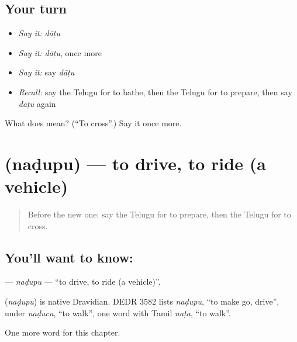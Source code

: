 \subsection*{Your turn}
\begin{itemize}
\raggedright
  \item \emph{Say it:} \emph{dāṭu}
  \item \emph{Say it:} \emph{dāṭu}, once more
  \item \emph{Say it:} say \emph{dāṭu}
  \item \emph{Recall:} say the Telugu for to bathe, then the Telugu for to prepare, then say \emph{dāṭu} again
\end{itemize}

\begin{tcolorbox}[breakable,colback=teal!4,colframe=teal!35!black,title={Before you move on}]
What does  mean? (\textquotedblleft{}To cross\textquotedblright{}.) Say it once more.
\end{tcolorbox}
\section[\texorpdfstring{\te{నడుపు} (naḍupu)}{నడుపు (naḍupu)}]{ (naḍupu) — to drive, to ride (a vehicle)}

\label{lesson:TE-C278-nadupu}



\begin{quote}
Before the new one: say the Telugu for to prepare, then the Telugu for to cross.
\end{quote}

\subsection*{You'll want to know: }
\textbf{} — \emph{naḍupu} — \textquotedblleft{}to drive, to ride (a vehicle)\textquotedblright{}.

\begin{cousinweb}
\textbf{} (\emph{naḍupu}) is native Dravidian. DEDR 3582 lists \emph{naḍupu}, \textquotedblleft{}to make go, drive\textquotedblright{}, under \emph{naḍucu}, \textquotedblleft{}to walk\textquotedblright{}, one word with Tamil \emph{naṭa}, \textquotedblleft{}to walk\textquotedblright{}.
\end{cousinweb}

\begin{grammarlens}[title={What you've built}]
One more word for this chapter.
\end{grammarlens}

